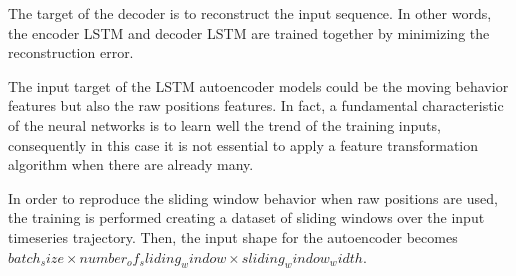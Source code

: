 The target of the decoder is to reconstruct the input sequence. In other words, the encoder LSTM and decoder LSTM are trained together by minimizing the reconstruction error. 

The input target of the LSTM autoencoder models could be the moving behavior features but also the raw positions features. In fact, a fundamental characteristic of the neural networks is to learn well the trend of the training inputs, consequently in this case it is not essential to apply a feature transformation algorithm when there are already many. 

In order to reproduce the sliding window behavior when raw positions are used, the training is performed creating a dataset of sliding windows over the input timeseries trajectory. Then, the input shape for the autoencoder becomes $batch_size \times number_of_sliding_window \times sliding_window_width $.